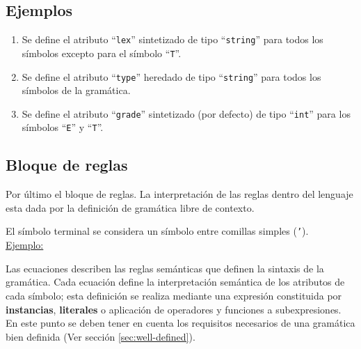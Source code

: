 \subsection*{Ejemplos}
\begin{enumerate}

\item 
\begin{center}
\end{center}
\vspace{0.2cm}
Se define el atributo ``\texttt{lex}'' sintetizado de tipo ``\texttt{string}'' para todos los símbolos excepto para el símbolo ``\texttt{T}''.

\item

\begin{center}
\end{center}
\vspace{0.2cm}
Se define el atributo ``\texttt{type}'' heredado de tipo ``\texttt{string}'' para todos los símbolos de la gramática.

\item 

\begin{center}
\end{center}
\vspace{0.2cm}
Se define el atributo ``\texttt{grade}'' sintetizado (por defecto) de tipo ``\texttt{int}'' para los símbolos ``\texttt{E}'' y ``\texttt{T}''.\\
\end{enumerate}

\subsection{Bloque de reglas}
Por último el bloque de reglas. La interpretación de las reglas dentro del lenguaje esta dada por la definición de gramática libre de contexto.          

El símbolo terminal se considera un símbolo entre comillas simples (\texttt{'}).\\ 

\underline{Ejemplo:}\ \\
\vspace{0.2cm}

Las ecuaciones describen las reglas semánticas que definen la sintaxis de la gramática. Cada ecuación define la interpretación semántica de los atributos de cada símbolo; esta definición se realiza mediante una expresión constituida por \textbf{instancias}, \textbf{literales} o aplicación de operadores y funciones a subexpresiones.
En este punto se deben tener en cuenta los requisitos necesarios de una gramática bien definida (Ver sección \ref{sec:well-defined}).

